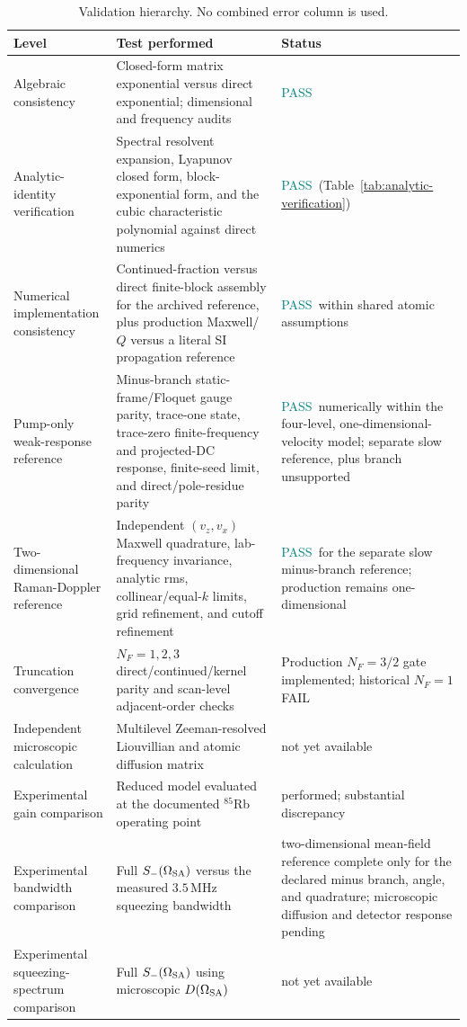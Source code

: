\documentclass[11pt,a4paper]{article}
\newcommand{\MHz}{\,\mathrm{MHz}}
\newcommand{\pending}{\textcolor{amber}{not yet available}}
\newcommand{\pass}{\textcolor{teal}{PASS}}
\newcommand{\fail}{\textcolor{red!70!black}{FAIL}}
\begin{document}
\begin{table}[ht]
\centering
\caption{Validation hierarchy. No combined error column is used.}
\label{tab:validation-hierarchy}
\small
\begin{tabularx}{\textwidth}{L{3.4cm}Y L{3.0cm}}
\toprule
Level & Test performed & Status\\
\midrule
Algebraic consistency & Closed-form matrix exponential versus direct
exponential; dimensional and frequency audits & \pass\\
Analytic-identity verification & Spectral resolvent expansion, Lyapunov
closed form, block-exponential form, and the cubic characteristic polynomial
against direct numerics & \pass\ (Table~\ref{tab:analytic-verification})\\
Numerical implementation consistency & Continued-fraction versus direct
finite-block assembly for the archived reference, plus production Maxwell/$Q$
versus a literal SI propagation reference & \pass\ within shared atomic
assumptions\\
Pump-only weak-response reference & Minus-branch static-frame/Floquet gauge
parity, trace-one state, trace-zero finite-frequency and projected-DC response,
finite-seed limit, and direct/pole-residue parity & \pass\ numerically within
the four-level, one-dimensional-velocity model; separate slow reference,
plus branch unsupported\\
Two-dimensional Raman-Doppler reference & Independent $(v_z,v_x)$ Maxwell
quadrature, lab-frequency invariance, analytic rms, collinear/equal-$k$ limits,
grid refinement, and cutoff refinement & \pass\ for the separate slow
minus-branch reference; production remains one-dimensional\\
Truncation convergence & $N_F=1,2,3$ direct/continued/kernel parity and
scan-level adjacent-order checks & Production $N_F=3/2$ gate implemented;
historical $N_F=1$ \fail\\
Independent microscopic calculation & Multilevel Zeeman-resolved
Liouvillian and atomic diffusion matrix & \pending\\
Experimental gain comparison & Reduced model evaluated at the documented
$^{85}$Rb operating point & performed; substantial discrepancy\\
Experimental bandwidth comparison & Full $S_-(\Omega_{\rm SA})$ versus the
measured $3.5\MHz$ squeezing bandwidth & two-dimensional mean-field reference
complete only for the declared minus branch, angle, and quadrature; microscopic
diffusion and detector response pending\\
Experimental squeezing-spectrum comparison & Full
$S_-(\Omega_{\rm SA})$ using microscopic $D(\Omega_{\rm SA})$ &
\pending\\
\bottomrule
\end{tabularx}
\end{table}
\end{document}
